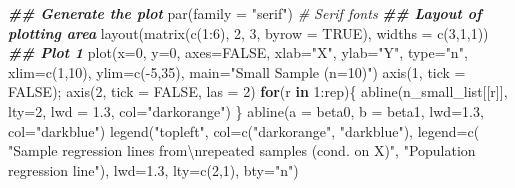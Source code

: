 \documentclass[
  14pt,
]{memoir}
\newenvironment{Shaded}{\begin{snugshade}}{\end{snugshade}}
\newcommand{\AttributeTok}[1]{\textcolor[rgb]{0.77,0.63,0.00}{#1}}
\newcommand{\CommentTok}[1]{\textcolor[rgb]{0.56,0.35,0.01}{\textit{#1}}}
\newcommand{\ConstantTok}[1]{\textcolor[rgb]{0.00,0.00,0.00}{#1}}
\newcommand{\ControlFlowTok}[1]{\textcolor[rgb]{0.13,0.29,0.53}{\textbf{#1}}}
\newcommand{\DecValTok}[1]{\textcolor[rgb]{0.00,0.00,0.81}{#1}}
\newcommand{\DocumentationTok}[1]{\textcolor[rgb]{0.56,0.35,0.01}{\textbf{\textit{#1}}}}
\newcommand{\FloatTok}[1]{\textcolor[rgb]{0.00,0.00,0.81}{#1}}
\newcommand{\FunctionTok}[1]{\textcolor[rgb]{0.00,0.00,0.00}{#1}}
\newcommand{\NormalTok}[1]{#1}
\newcommand{\SpecialCharTok}[1]{\textcolor[rgb]{0.00,0.00,0.00}{#1}}
\newcommand{\StringTok}[1]{\textcolor[rgb]{0.31,0.60,0.02}{#1}}
\begin{document}
\begin{Shaded}
\begin{Highlighting}[]
\DocumentationTok{\#\# Generate the plot}
\FunctionTok{par}\NormalTok{(}\AttributeTok{family =} \StringTok{"serif"}\NormalTok{) }\CommentTok{\# Serif fonts}
\DocumentationTok{\#\# Layout of plotting area}
\FunctionTok{layout}\NormalTok{(}\FunctionTok{matrix}\NormalTok{(}\FunctionTok{c}\NormalTok{(}\DecValTok{1}\SpecialCharTok{:}\DecValTok{6}\NormalTok{), }\DecValTok{2}\NormalTok{, }\DecValTok{3}\NormalTok{, }\AttributeTok{byrow =} \ConstantTok{TRUE}\NormalTok{), }\AttributeTok{widths =} \FunctionTok{c}\NormalTok{(}\DecValTok{3}\NormalTok{,}\DecValTok{1}\NormalTok{,}\DecValTok{1}\NormalTok{))}
\DocumentationTok{\#\# Plot 1}
\FunctionTok{plot}\NormalTok{(}\AttributeTok{x=}\DecValTok{0}\NormalTok{, }\AttributeTok{y=}\DecValTok{0}\NormalTok{, }\AttributeTok{axes=}\ConstantTok{FALSE}\NormalTok{, }\AttributeTok{xlab=}\StringTok{"X"}\NormalTok{, }\AttributeTok{ylab=}\StringTok{"Y"}\NormalTok{, }\AttributeTok{type=}\StringTok{"n"}\NormalTok{,}
     \AttributeTok{xlim=}\FunctionTok{c}\NormalTok{(}\DecValTok{1}\NormalTok{,}\DecValTok{10}\NormalTok{), }\AttributeTok{ylim=}\FunctionTok{c}\NormalTok{(}\SpecialCharTok{{-}}\DecValTok{5}\NormalTok{,}\DecValTok{35}\NormalTok{), }\AttributeTok{main=}\StringTok{"Small Sample (n=10)"}\NormalTok{)}
\FunctionTok{axis}\NormalTok{(}\DecValTok{1}\NormalTok{, }\AttributeTok{tick =} \ConstantTok{FALSE}\NormalTok{); }\FunctionTok{axis}\NormalTok{(}\DecValTok{2}\NormalTok{, }\AttributeTok{tick =} \ConstantTok{FALSE}\NormalTok{, }\AttributeTok{las =} \DecValTok{2}\NormalTok{)}
\ControlFlowTok{for}\NormalTok{(r }\ControlFlowTok{in} \DecValTok{1}\SpecialCharTok{:}\NormalTok{rep)\{}
\FunctionTok{abline}\NormalTok{(n\_small\_list[[r]], }\AttributeTok{lty=}\DecValTok{2}\NormalTok{, }\AttributeTok{lwd =} \FloatTok{1.3}\NormalTok{, }\AttributeTok{col=}\StringTok{"darkorange"}\NormalTok{)}
\NormalTok{\}}
\FunctionTok{abline}\NormalTok{(}\AttributeTok{a =}\NormalTok{ beta0, }\AttributeTok{b =}\NormalTok{ beta1, }\AttributeTok{lwd=}\FloatTok{1.3}\NormalTok{, }\AttributeTok{col=}\StringTok{"darkblue"}\NormalTok{)}
\FunctionTok{legend}\NormalTok{(}\StringTok{"topleft"}\NormalTok{, }\AttributeTok{col=}\FunctionTok{c}\NormalTok{(}\StringTok{"darkorange"}\NormalTok{, }\StringTok{"darkblue"}\NormalTok{), }\AttributeTok{legend=}\FunctionTok{c}\NormalTok{(}
\StringTok{"Sample regression lines from}\SpecialCharTok{\textbackslash{}n}\StringTok{repeated samples (cond. on X)"}\NormalTok{, }
                  \StringTok{"Population regression line"}\NormalTok{), }
       \AttributeTok{lwd=}\FloatTok{1.3}\NormalTok{, }\AttributeTok{lty=}\FunctionTok{c}\NormalTok{(}\DecValTok{2}\NormalTok{,}\DecValTok{1}\NormalTok{), }\AttributeTok{bty=}\StringTok{"n"}\NormalTok{)}

\end{Highlighting}
\end{Shaded}
\end{document}
